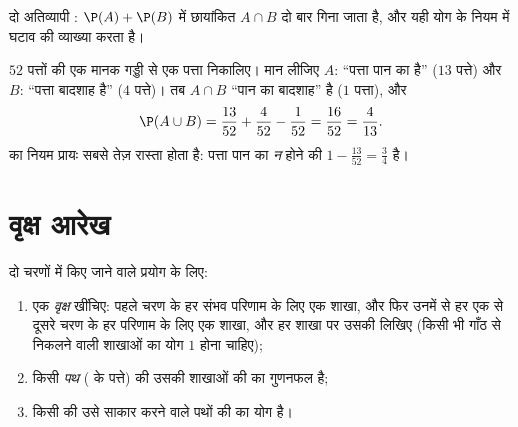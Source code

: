 \begin{omfigure}

{\small दो अतिव्यापी : $\P(A) + \P(B)$ में छायांकित  $A \cap B$ दो बार गिना
जाता है, और यही योग के नियम में घटाव की व्याख्या करता है।}
\end{omfigure}

\begin{example}\label{ex:g10:proba:cards}
$52$ पत्तों की एक मानक गड्डी से एक पत्ता निकालिए। मान लीजिए $A$: ``पत्ता
पान का है'' ($13$ पत्ते) और $B$: ``पत्ता बादशाह है'' ($4$ पत्ते)। तब $A \cap B$
``पान का बादशाह'' है ($1$ पत्ता), और
\[
\P(A \cup B) = \frac{13}{52} + \frac{4}{52} - \frac{1}{52} = \frac{16}{52}
= \frac{4}{13}.
\]
 का नियम प्रायः सबसे तेज़ रास्ता होता है: पत्ता पान का \emph{न} होने की
 $1 - \frac{13}{52} = \frac34$ है।
\end{example}

\section{वृक्ष आरेख}

\begin{method}[दो-चरणीय प्रयोग]\label{met:g10:proba:tree}
दो चरणों में किए जाने वाले प्रयोग के लिए:
\begin{enumerate}
  \item एक \emph{वृक्ष} खींचिए: पहले चरण के हर संभव
        परिणाम के लिए एक शाखा, और फिर उनमें से हर एक से दूसरे चरण के हर
        परिणाम के लिए एक शाखा, और हर शाखा पर उसकी  लिखिए (किसी भी
        गाँठ से निकलने वाली शाखाओं का योग $1$ होना चाहिए);
  \item किसी \emph{पथ} ( के पत्ते) की  उसकी शाखाओं की
         का गुणनफल है;
  \item किसी  की  उसे साकार करने वाले पथों की  का
        योग है।
\end{enumerate}
\end{method}

